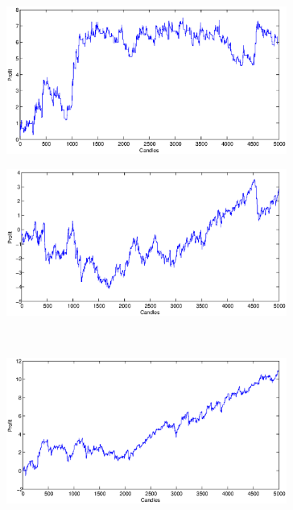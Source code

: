 \documentclass{tewiart}
\begin{document}
\begin{figure}[h]
\centering
\begin{minipage}{.49\linewidth}
\centering 
\includegraphics[width=0.82\textwidth]{images/S1a_bossa.eps}
\label{jedno}
\end{minipage}
\begin{minipage}{.49\linewidth}
\centering 
\includegraphics[width=0.82\textwidth]{images/S1b_bossa.eps}
\label{dwu}
\end{minipage}
\\
\begin{minipage}{.49\linewidth}
\centering 
\includegraphics[width=0.82\textwidth]{images/S1c_bossa.eps}
\label{cztero}
\end{minipage}
\begin{minipage}{.49\linewidth}

\end{minipage}
\end{figure}
\end{document}
